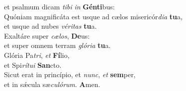 \evenverse et psalmum dicam \textit{ti}\textit{bi} \textit{in} \textbf{Gén}\textbf{ti}bus:\\
\oddverse Quóniam magnificáta est usque ad cælos misericór\textit{di}\textit{a} \textbf{tu}a,~\*\\
\oddverse et usque ad nubes \textit{vé}\textit{ri}\textit{tas} \textbf{tu}a.\\
\evenverse Exaltáre super \textit{cæ}\textit{los}, \textbf{De}us:~\*\\
\evenverse et super omnem terram \textit{gló}\textit{ri}\textit{a} \textbf{tu}a.\\
\oddverse Glória Pa\textit{tri}, \textit{et} \textbf{Fí}lio,~\*\\
\oddverse et Spi\textit{rí}\textit{tu}\textit{i} \textbf{San}cto.\\
\evenverse Sicut erat in princípio, et \textit{nunc}, \textit{et} \textbf{sem}per,~\*\\
\evenverse et in sǽcula sæ\textit{cu}\textit{ló}\textit{rum}. \textbf{A}men.\\
